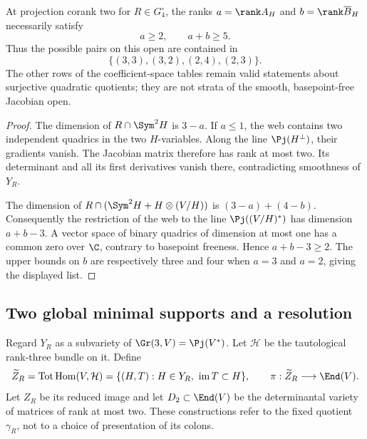 \begin{proposition}
\label{prop:smooth-web-rank-admissibility}
At projection corank two for \(R\in G_4^\circ\), the ranks
\(a=\rank A_H\) and \(b=\rank\overline B_H\) necessarily satisfy
\[
 a\ge2,\qquad a+b\ge5.
\]
Thus the possible pairs on this open are contained in
\[
 \{(3,3),(3,2),(2,4),(2,3)\}.
\]
The other rows of the coefficient-space tables remain valid statements
about surjective quadratic quotients; they are not strata of the
smooth, basepoint-free Jacobian open.
\end{proposition}
\begin{proof}
The dimension of \(R\cap\Sym^2H\) is \(3-a\).  If \(a\le1\),
the web contains two independent quadrics in the two \(H\)-variables.
Along the line \(\Pj(H^\perp)\), their gradients vanish.  The
Jacobian matrix therefore has rank at most two.  Its determinant and
all its first derivatives vanish there, contradicting smoothness of
\(Y_R\).

The dimension of
\(R\cap(\Sym^2H+H\otimes(V/H))\) is \((3-a)+(4-b)\).
Consequently the restriction of the web to the line
\(\Pj((V/H)^*)\) has dimension \(a+b-3\).  A vector space of
binary quadrics of dimension at most one has a common zero over
\(\C\), contrary to basepoint freeness.  Hence \(a+b-3\ge2\).
The upper bounds on \(b\) are respectively three and four when
\(a=3\) and \(a=2\), giving the displayed list.
\end{proof}

\subsection{Two global minimal supports and a resolution}

Regard \(Y_R\) as a subvariety of \(\Gr(3,V)=\Pj(V^*)\).  Let
\(\mathcal H\) be the tautological rank-three bundle on it.  Define
\[
 \widetilde Z_R=\operatorname{Tot}\operatorname{Hom}(V,\mathcal H)
 =\{(H,T):H\in Y_R,\ \operatorname{im}T\subset H\},
 \qquad \pi:\widetilde Z_R\longrightarrow\End(V).
\]
Let \(Z_R\) be its reduced image and let
\(D_2\subset\End(V)\) be the determinantal variety of matrices of
rank at most two.  These constructions refer to the fixed quotient
\(\gamma_R\), not to a choice of presentation of its colons.

